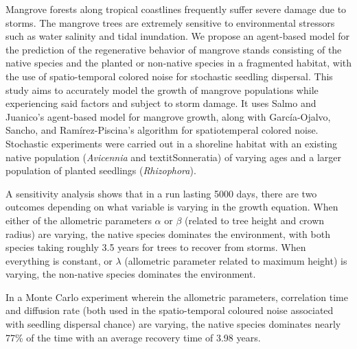 Mangrove forests along tropical coastlines frequently suffer severe damage due to storms. The mangrove trees are extremely sensitive to environmental stressors such as water salinity and tidal inundation. We propose an agent-based model for the prediction of the regenerative behavior of mangrove stands consisting of the native species and the planted or non-native species in a fragmented habitat, with the use of spatio-temporal colored noise for stochastic seedling dispersal. This study aims to accurately model the growth of mangrove populations while experiencing said factors and subject to storm damage. It uses Salmo and Juanico's agent-based model for mangrove growth, along with García-Ojalvo, Sancho, and Ramírez-Piscina's algorithm for spatiotemperal colored noise. Stochastic experiments were carried out in a shoreline habitat with an existing native population (\textit{Avicennia} and  textit{Sonneratia}) of varying ages and a larger population of planted seedlings  (\textit{Rhizophora}). 

A sensitivity analysis shows that in a run lasting 5000 days, there are two outcomes depending on what variable is varying in the growth equation. When either of the allometric parameters $\alpha$ or $\beta$ (related to tree height and crown radius) are varying, the native species dominates the environment, with both species taking roughly 3.5 years for trees to recover from storms. When everything is constant, or $\lambda$ (allometric parameter related to maximum height) is varying, the non-native species dominates the environment. 
 
In a Monte Carlo experiment wherein the allometric parameters, correlation time and diffusion rate (both used in the spatio-temporal coloured noise associated with seedling dispersal chance) are varying, the native species dominates nearly 77\% of the time with an average recovery time of 3.98 years.